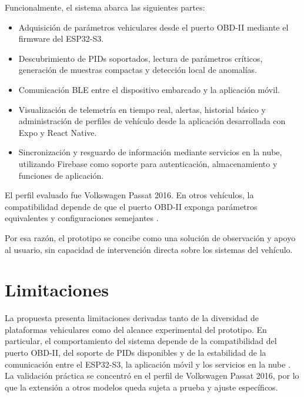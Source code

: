\documentclass[12pt,letterpaper]{report}
\begin{document}
Funcionalmente, el sistema abarca las siguientes partes:

\begin{itemize}
    \item Adquisición de parámetros vehiculares desde el puerto OBD-II mediante el firmware del ESP32-S3.
    \item Descubrimiento de PIDs soportados, lectura de parámetros críticos, generación de muestras compactas y detección local de anomalías.
    \item Comunicación BLE entre el dispositivo embarcado y la aplicación móvil.
    \item Visualización de telemetría en tiempo real, alertas, historial básico y administración de perfiles de vehículo desde la aplicación desarrollada con Expo y React Native.
    \item Sincronización y resguardo de información mediante servicios en la nube, utilizando Firebase como soporte para autenticación, almacenamiento y funciones de aplicación.
\end{itemize}

El perfil evaluado fue Volkswagen Passat 2016. En otros vehículos, la compatibilidad depende de que el puerto OBD-II exponga parámetros equivalentes y configuraciones semejantes \cite{zhang2020_iov_edge,kalalas2025_ai_driven_monitoring}.

Por esa razón, el prototipo se concibe como una solución de observación y apoyo al usuario, sin capacidad de intervención directa sobre los sistemas del vehículo.

\section{Limitaciones}

La propuesta presenta limitaciones derivadas tanto de la diversidad de plataformas vehiculares como del alcance experimental del prototipo. En particular, el comportamiento del sistema depende de la compatibilidad del puerto OBD-II, del soporte de PIDs disponibles y de la estabilidad de la comunicación entre el ESP32-S3, la aplicación móvil y los servicios en la nube \cite{sae2022_j1978_obdii_scan_tool,michailidis2025_obdii_review,zhang2020_iov_edge}. La validación práctica se concentró en el perfil de Volkswagen Passat 2016, por lo que la extensión a otros modelos queda sujeta a prueba y ajuste específicos.
\end{document}
